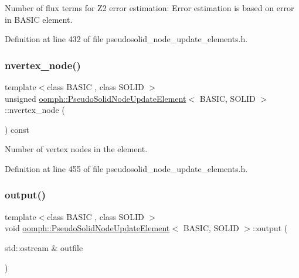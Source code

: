Number of \textquotesingle{}flux\textquotesingle{} terms for Z2 error estimation\+: Error estimation is based on error in B\+A\+S\+IC element. 



Definition at line 432 of file pseudosolid\+\_\+node\+\_\+update\+\_\+elements.\+h.

\mbox{\label{classoomph_1_1PseudoSolidNodeUpdateElement_a8a6830facb4584f4e077169296d3d88c}} 
\subsubsection{\texorpdfstring{nvertex\+\_\+node()}{nvertex\_node()}}
{\footnotesize\ttfamily template$<$class B\+A\+S\+IC , class S\+O\+L\+ID $>$ \\
unsigned \hyperlink{classoomph_1_1PseudoSolidNodeUpdateElement}{oomph\+::\+Pseudo\+Solid\+Node\+Update\+Element}$<$ B\+A\+S\+IC, S\+O\+L\+ID $>$\+::nvertex\+\_\+node (\begin{DoxyParamCaption}{ }\end{DoxyParamCaption}) const\hspace{0.3cm}{\ttfamily [inline]}}



Number of vertex nodes in the element. 



Definition at line 455 of file pseudosolid\+\_\+node\+\_\+update\+\_\+elements.\+h.

\mbox{\label{classoomph_1_1PseudoSolidNodeUpdateElement_a41addbcf4a1ed2711e24632c8a122dcb}} 
\subsubsection{\texorpdfstring{output()}{output()}\hspace{0.1cm}{\footnotesize\ttfamily [1/4]}}
{\footnotesize\ttfamily template$<$class B\+A\+S\+IC , class S\+O\+L\+ID $>$ \\
void \hyperlink{classoomph_1_1PseudoSolidNodeUpdateElement}{oomph\+::\+Pseudo\+Solid\+Node\+Update\+Element}$<$ B\+A\+S\+IC, S\+O\+L\+ID $>$\+::output (\begin{DoxyParamCaption}\item[{std\+::ostream \&}]{outfile }\end{DoxyParamCaption})\hspace{0.3cm}{\ttfamily [inline]}}



